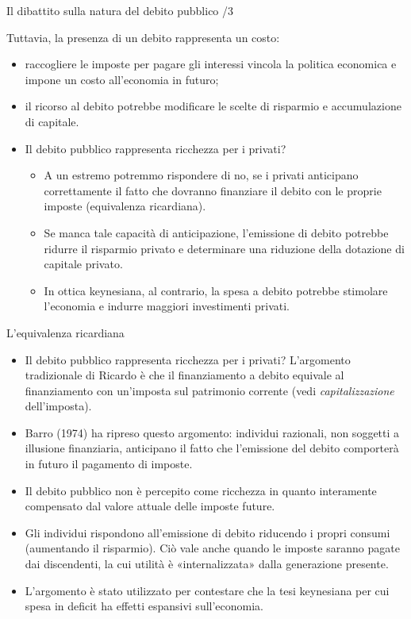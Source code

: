 \documentclass[aspectratio=149,11pt,italian]{beamer}
\begin{document}
\begin{frame}{Il dibattito sulla natura del debito pubblico /3}

  Tuttavia, la presenza di un debito rappresenta un costo:
  \begin{itemize}
  \item raccogliere le imposte per pagare gli interessi vincola la politica
    economica e impone un costo all'economia in futuro;
  \item il ricorso al debito potrebbe modificare le scelte di risparmio e
    accumulazione di capitale.
  \item Il debito pubblico rappresenta ricchezza per i privati?
    \begin{itemize}
    \item A un estremo potremmo rispondere di no, se i privati anticipano
      correttamente il fatto che dovranno finanziare il debito con le proprie
      imposte (equivalenza ricardiana).
    \item Se manca tale capacità di anticipazione, l'emissione di debito
      potrebbe ridurre il risparmio privato e determinare una riduzione della
      dotazione di capitale privato.
    \item In ottica keynesiana, al contrario, la spesa a debito potrebbe
      stimolare l'economia e indurre maggiori investimenti privati.
    \end{itemize}
  \end{itemize}
\end{frame}

\begin{frame}{L'equivalenza ricardiana}

  \begin{itemize}
  \item Il debito pubblico rappresenta ricchezza per i privati? L'argomento
    tradizionale di Ricardo è che il finanziamento a debito equivale al
    finanziamento con un'imposta sul patrimonio corrente (vedi
    \emph{capitalizzazione} dell'imposta).
  \item Barro (1974) ha ripreso questo argomento: individui razionali, non
    soggetti a illusione finanziaria, anticipano il fatto che l'emissione del
    debito comporterà in futuro il pagamento di imposte.
  \item Il debito pubblico non è percepito come ricchezza in quanto
    interamente compensato dal valore attuale delle imposte future.
  \item Gli individui rispondono all'emissione di debito riducendo i propri
    consumi (aumentando il risparmio). Ciò vale anche quando le imposte
    saranno pagate dai discendenti, la cui utilità è «internalizzata» dalla
    generazione presente.
  \item L'argomento è stato utilizzato per contestare che la tesi keynesiana
    per cui spesa in deficit ha effetti espansivi sull'economia.
  \end{itemize}
\end{frame}
\end{document}
